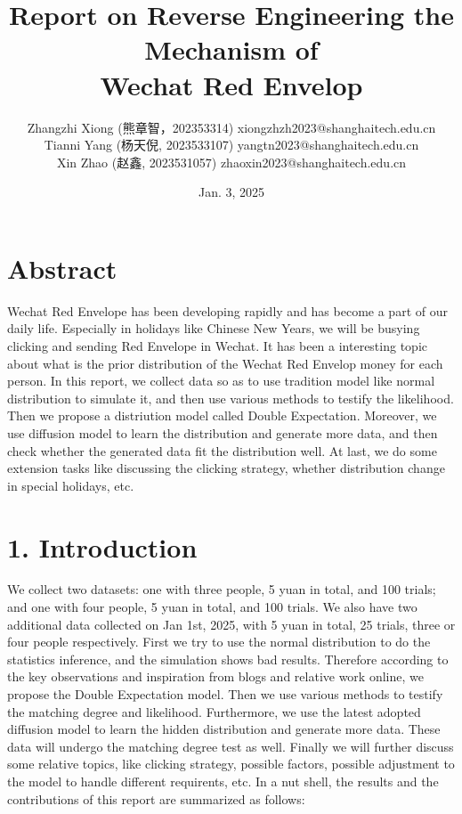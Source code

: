 \documentclass[11pt]{article}
\title{Report on Reverse Engineering the Mechanism of \\ Wechat Red Envelop}
\date{Jan. 3, 2025}
\author{
        Zhangzhi Xiong (熊章智，202353314) xiongzhzh2023@shanghaitech.edu.cn \\
        Tianni Yang (杨天倪, 2023533107) yangtn2023@shanghaitech.edu.cn\\
        Xin Zhao (赵鑫, 2023531057) zhaoxin2023@shanghaitech.edu.cn
    }
\begin{document}
    
    \maketitle

    \section*{Abstract}\label{abstract}

Wechat Red Envelope has been developing rapidly and has become a part of
our daily life. Especially in holidays like Chinese New Years, we will
be busying clicking and sending Red Envelope in Wechat. It has been a
interesting topic about what is the prior distribution of the Wechat Red
Envelop money for each person. In this report, we collect data so as to
use tradition model like normal distribution to simulate it, and then
use various methods to testify the likelihood. Then we propose a
distriution model called Double Expectation. Moreover, we use diffusion
model to learn the distribution and generate more data, and then check
whether the generated data fit the distribution well. At last, we do
some extension tasks like discussing the clicking strategy, whether
distribution change in special holidays, etc.

    \section*{1. Introduction}\label{introduction}

We collect two datasets: one with three people, 5 yuan in total, and 100
trials; and one with four people, 5 yuan in total, and 100 trials. We
also have two additional data collected on Jan 1st, 2025, with 5 yuan in
total, 25 trials, three or four people respectively. First we try to use
the normal distribution to do the statistics inference, and the
simulation shows bad results. Therefore according to the key
observations and inspiration from blogs and relative work online, we
propose the Double Expectation model. Then we use various methods to
testify the matching degree and likelihood. Furthermore, we use the
latest adopted diffusion model to learn the hidden distribution and
generate more data. These data will undergo the matching degree test as
well. Finally we will further discuss some relative topics, like
clicking strategy, possible factors, possible adjustment to the model to
handle different requirents, etc. In a nut shell, the results and the
contributions of this report are summarized as follows:
\end{document}
